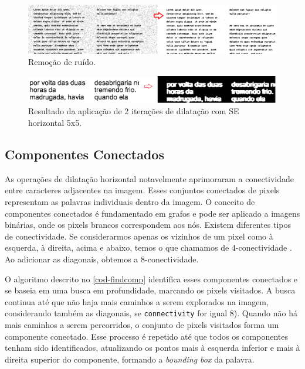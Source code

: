 \documentclass[english, 
               brazil, 
               bsc] %
               {dcomp-abntex2}
\begin{document}
\begin{figure}[htb]
        \caption{\label{ruidos} \small  Remoção de ruído. }
        \begin{center}
            \includegraphics[scale=0.43]{./images/noise.png}
        \end{center}
\end{figure}




\begin{figure}[htb]
        \caption{\label{horz} \small Resultado da aplicação de 2 iterações de dilatação com SE horizontal 5x5. }
        \begin{center}
            \includegraphics[scale=0.15]{./images/horizontal_5x5_aplicacao.png}
        \end{center}
\end{figure}






\subsection{Componentes Conectados} \label{sec-comp}




As operações de dilatação horizontal notavelmente aprimoraram a conectividade entre caracteres adjacentes na imagem. Esses conjuntos conectados de pixels representam as palavras individuais dentro da imagem. O conceito de componentes conectados é fundamentado em grafos e pode ser aplicado a imagens binárias, onde os pixels brancos correspondem aos nós. Existem diferentes tipos de conectividade. Se considerarmos apenas os vizinhos de um pixel como à esquerda, à direita, acima e abaixo, temos o que chamamos de 4-conectividade \cite[2.5.2 Adjacency, Connectivity, Regions, and Boundaries]{gonzalez2008digital}. Ao adicionar as diagonais, obtemos a 8-conectividade.


O algoritmo descrito no \autoref{cod-findcomp} identifica esses componentes conectados e se baseia em uma busca em profundidade, marcando os pixels visitados. A busca continua até que não haja mais caminhos a serem explorados na imagem, considerando também as diagonais, se \texttt{connectivity} for igual 8). Quando não há mais caminhos a serem percorridos, o conjunto de pixels visitados forma um componente conectado. Esse processo é repetido até que todos os componentes tenham sido identificados, atualizando os pontos mais à esquerda inferior e mais à direita superior do componente, formando a \textit{bounding box} da palavra.
\end{document}
